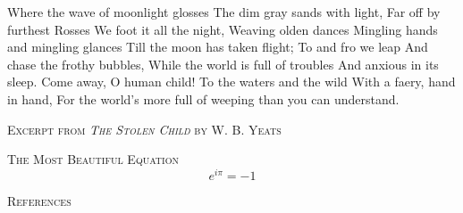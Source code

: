 \documentclass[12pt]{empposter}
\newcommand\heading[1]{\textsc{\LARGE {#1}} \\[0.5em]}
\begin{document}
\begin{paracol}{2}
\begin{verbbox}[\normalfont]
Where the wave of moonlight glosses
The dim gray sands with light,
Far off by furthest Rosses
We foot it all the night,
Weaving olden dances
Mingling hands and mingling glances
Till the moon has taken flight;
To and fro we leap
And chase the frothy bubbles,
While the world is full of troubles
And anxious in its sleep.
Come away, O human child!
To the waters and the wild
With a faery, hand in hand,
For the world's more full of weeping than you can understand.
\end{verbbox}
\begin{borderedbox}[marginleft=0.25in]
    \heading{Excerpt from \textit{The Stolen Child} by W. B. Yeats}
    \par\theverbbox
\end{borderedbox}

\begin{borderedbox}[marginleft=0.25in]
    \heading{The Most Beautiful Equation}
    \begin{equation*}
        e^{i \pi} = -1
    \end{equation*}
\end{borderedbox}
\end{paracol}

\nocite{*}
\begin{borderedbox}[width=\linewidth]
    \heading{References}
    
\end{borderedbox}
\end{document}
